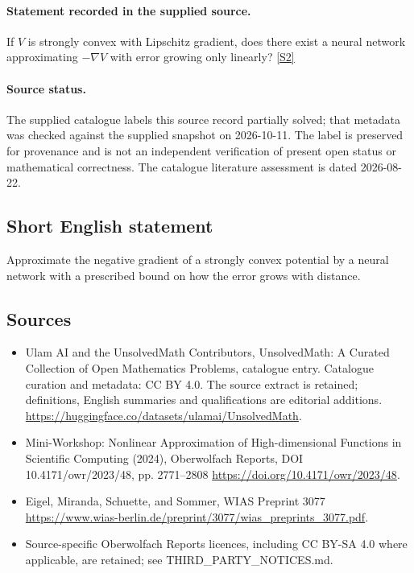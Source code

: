\documentclass[11pt]{article}
\begin{document}
\paragraph{Statement recorded in the supplied source.}
If $V$ is strongly convex with Lipschitz gradient, does there exist a neural network approximating $-\nabla V$ with error growing only linearly? \href{https://doi.org/10.4171/owr/2023/48}{[S2]}
\paragraph{Source status.}
The supplied catalogue labels this source record partially solved; that metadata was checked against the supplied snapshot on 2026-10-11. The label is preserved for provenance and is not an independent verification of present open status or mathematical correctness. The catalogue literature assessment is dated 2026-08-22.
\subsection{Short English statement}
Approximate the negative gradient of a strongly convex potential by a neural network with a prescribed bound on how the error grows with distance.
\subsection{Sources}
\begin{itemize}
\item[S1] Ulam AI and the UnsolvedMath Contributors, UnsolvedMath: A Curated Collection of Open Mathematics Problems, catalogue entry. Catalogue curation and metadata: CC BY 4.0. The source extract is retained; definitions, English summaries and qualifications are editorial additions.
\url{https://huggingface.co/datasets/ulamai/UnsolvedMath}.
\item[S2] Mini-Workshop: Nonlinear Approximation of High-dimensional Functions in Scientific Computing (2024), Oberwolfach Reports, DOI 10.4171/owr/2023/48, pp. 2771--2808
\url{https://doi.org/10.4171/owr/2023/48}.
\item[S3] Eigel, Miranda, Schuette, and Sommer, WIAS Preprint 3077
\url{https://www.wias-berlin.de/preprint/3077/wias_preprints_3077.pdf}.
\item Source-specific Oberwolfach Reports licences, including CC BY-SA 4.0 where applicable, are retained; see THIRD\_PARTY\_NOTICES.md.
\end{itemize}
\end{document}
